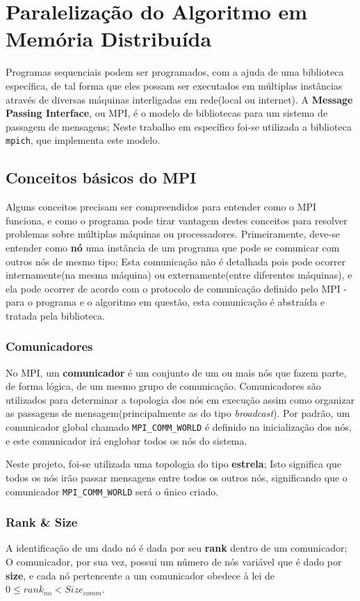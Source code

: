 \section{Paralelização do Algoritmo em Memória Distribuída}
Programas sequenciais podem ser programados, com a ajuda de uma biblioteca específica, de tal forma que eles possam ser executados em múltiplas instâncias através de diversas máquinas interligadas em rede(local ou internet). A \textbf{Message Passing Interface}, ou MPI, é o modelo de bibliotecas para um sistema de passagem de mensagens; Neste trabalho em específico foi-se utilizada a biblioteca \texttt{mpich}, que implementa este modelo.

\subsection{Conceitos básicos do MPI}
Alguns conceitos precisam ser compreendidos para entender como o MPI funciona, e como o programa pode tirar vantagem destes conceitos para resolver problemas sobre múltiplas máquinas ou processadores. Primeiramente, deve-se entender como \textbf{nó} uma instância de um programa que pode se comunicar com outros nós de mesmo tipo; Esta comunicação não é detalhada pois pode ocorrer internamente(na mesma máquina) ou externamente(entre diferentes máquinas), e ela pode ocorrer de acordo com o protocolo de comunicação definido pelo MPI - para o programa e o algoritmo em questão, esta comunicação é abstraída e tratada pela biblioteca.

\subsubsection{Comunicadores}
No MPI, um \textbf{comunicador} é um conjunto de um ou mais nós que fazem parte, de forma lógica, de um mesmo grupo de comunicação. Comunicadores são utilizados para determinar a topologia dos nós em execução assim como organizar as passagens de mensagem(principalmente as do tipo \textit{broadcast}). Por padrão, um comunicador global chamado \texttt{MPI\_COMM\_WORLD} é definido na inicialização dos nós, e este comunicador irá englobar todos os nós do sistema.

Neste projeto, foi-se utilizada uma topologia do tipo \textbf{estrela}; Isto significa que todos os nós irão passar mensagens entre todos os outros nós, significando que o comunicador \texttt{MPI\_COMM\_WORLD} será o único criado.

\subsubsection{Rank \& Size}
A identificação de um dado nó é dada por seu \textbf{rank} dentro de um comunicador; O comunicador, por sua vez, possui um número de nós variável que é dado por \textbf{size}, e cada nó pertencente a um comunicador obedece à lei de $0\leq rank_{no}<Size_{comm}$.

